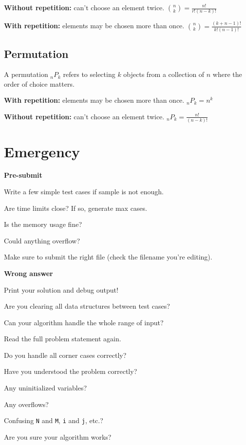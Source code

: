 \documentclass[a4paper]{article}
\begin{document}
\textbf{Without repetition:} can't choose an element twice. $\binom{n}{k} = \frac{n!}{r!(n-k)!}$

\textbf{With repetition:} elements may be chosen more than once. $\binom{n}{k} = \frac{(k+n-1)!}{k!(n-1)!}$

\subsection{Permutation}
A permutation ${}_nP_k$ refers to selecting $k$ objects from a collection of $n$ where the order of choice matters.

\textbf{With repetition:} elements may be chosen more than once. ${}_nP_k = n^k$

\textbf{Without repetition:} can't choose an element twice. ${}_nP_k = \frac{n!}{(n-k)!}$

\section{Emergency}
\noindent
\textbf{Pre-submit}

\noindent
Write a few simple test cases if sample is not enough.

\noindent
Are time limits close? If so, generate max cases.

\noindent
Is the memory usage fine?

\noindent
Could anything overflow?

\noindent
Make sure to submit the right file (check the filename you're editing).

\noindent
\textbf{Wrong answer}

\noindent
Print your solution and debug output!

\noindent
Are you clearing all data structures between test cases?

\noindent
Can your algorithm handle the whole range of input?

\noindent
Read the full problem statement again.

\noindent
Do you handle all corner cases correctly?

\noindent
Have you understood the problem correctly?

\noindent
Any uninitialized variables?

\noindent
Any overflows?

\noindent
Confusing \texttt{N} and \texttt{M}, \texttt{i} and \texttt{j}, etc.?

\noindent
Are you sure your algorithm works?
\end{document}
